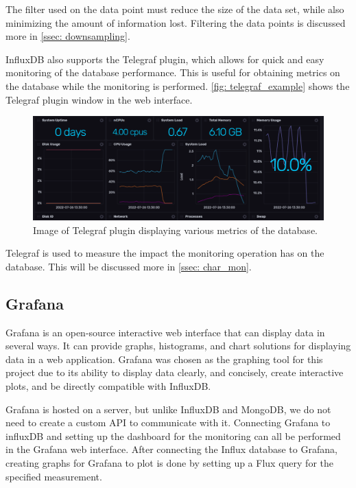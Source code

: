 \documentclass[main.tex]{subfiles}
\begin{document}
The filter used on the data point must reduce the size of the data set, while also minimizing the amount of information lost. Filtering the data points is discussed more in \autoref{ssec: downsampling}.

InfluxDB also supports the Telegraf plugin, which allows for quick and easy monitoring of the database performance. This is useful for obtaining metrics on the database while the monitoring is performed. \autoref{fig: telegraf_example} shows the Telegraf plugin window in the web interface.

\begin{figure}[!htpb]
    \centering
    \includegraphics[width=17cm, scale=4]{images/telegraf_example.png}
    \caption{Image of Telegraf plugin displaying various metrics of the database.}
    \label{fig: telegraf_example}
\end{figure}
\FloatBarrier

Telegraf is used to measure the impact the monitoring operation has on the database. This will be discussed more in \autoref{ssec: char_mon}.

\subsection{Grafana}
\label{ssec: grafana}
Grafana is an open-source interactive web interface that can display data in several ways. It can provide graphs, histograms, and chart solutions for displaying data in a web application. Grafana was chosen as the graphing tool for this project due to its ability to display data clearly, and concisely, create interactive plots, and be directly compatible with InfluxDB.

Grafana is hosted on a server, but unlike InfluxDB and MongoDB, we do not need to create a custom API to communicate with it. Connecting Grafana to influxDB and setting up the dashboard for the monitoring can all be performed in the Grafana web interface. After connecting the Influx database to Grafana, creating graphs for Grafana to plot is done by setting up a Flux query for the specified measurement.
\end{document}
